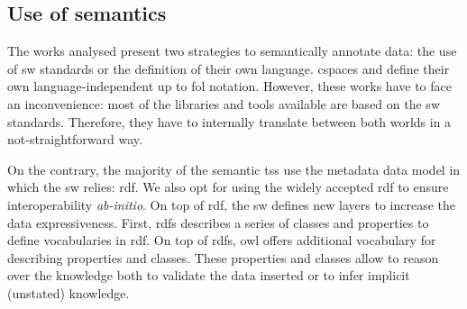 \subsection{Use of semantics}

The works analysed present two strategies to semantically annotate data: the use of \ac{sw} standards or the definition of their own language.
\ac{cspaces} \citep{martinrecuerda_towards_2005} and \citet{nardini_semantic_2013} define their own language-independent up to \ac{fol} notation.
However, these works have to face an inconvenience: most of the libraries and tools available are based on the \ac{sw} standards. %
Therefore, they have to internally translate between both worlds in a not-straightforward way. %




On the contrary, the majority of the semantic \acp{ts} use the metadata data model in which the \ac{sw} relies: \ac{rdf}. %
We also opt for using the widely accepted \ac{rdf} to ensure interoperability \emph{ab-initio}.
On top of \ac{rdf}, the \ac{sw} defines new layers to increase the data expressiveness.
First, \ac{rdfs}  describes a series of classes and properties to define vocabularies in \ac{rdf}.
On top of \ac{rdfs}, \ac{owl} offers additional vocabulary for describing properties and classes.
These properties and classes allow to reason over the knowledge both to validate the data inserted or to infer implicit (unstated) knowledge. %


